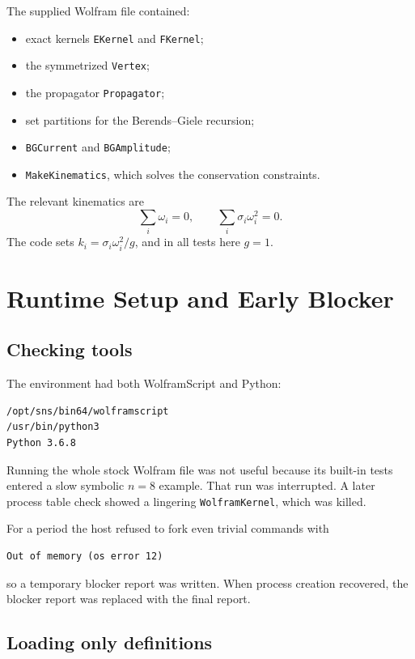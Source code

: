 \documentclass[11pt]{article}
\newcommand{\code}[1]{\texttt{#1}}
\begin{document}
The supplied Wolfram file contained:
\begin{itemize}
  \item exact kernels \code{EKernel} and \code{FKernel};
  \item the symmetrized \code{Vertex};
  \item the propagator \code{Propagator};
  \item set partitions for the Berends--Giele recursion;
  \item \code{BGCurrent} and \code{BGAmplitude};
  \item \code{MakeKinematics}, which solves the conservation constraints.
\end{itemize}

The relevant kinematics are
\[
  \sum_i \omega_i=0,\qquad
  \sum_i \sigma_i\omega_i^2=0.
\]
The code sets \(k_i=\sigma_i\omega_i^2/g\), and in all tests here \(g=1\).

\section{Runtime Setup and Early Blocker}

\subsection*{Checking tools}

The environment had both WolframScript and Python:

\begin{Verbatim}[fontsize=\small]
/opt/sns/bin64/wolframscript
/usr/bin/python3
Python 3.6.8
\end{Verbatim}

Running the whole stock Wolfram file was not useful because its built-in tests
entered a slow symbolic \(n=8\) example.  That run was interrupted.  A later
process table check showed a lingering \code{WolframKernel}, which was killed.

For a period the host refused to fork even trivial commands with
\begin{Verbatim}[fontsize=\small]
Out of memory (os error 12)
\end{Verbatim}
so a temporary blocker report was written.  When process creation recovered,
the blocker report was replaced with the final report.

\subsection*{Loading only definitions}
\end{document}
